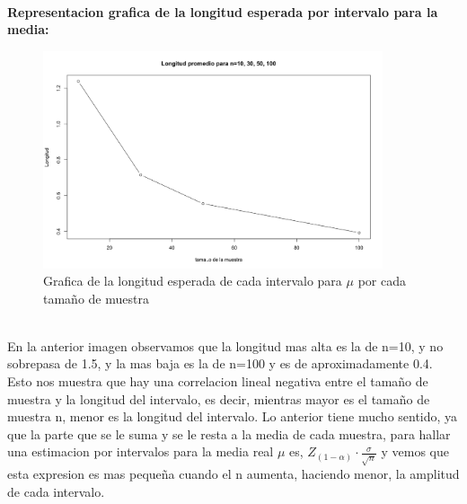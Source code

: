 \documentclass[letterpaper,12pt,onecolumn,titlepage]{article}
\begin{document}
~\\ \textbf{Representacion grafica de la longitud esperada por intervalo para la media:}
~\\ \begin{figure}[!h]
    \begin{center}
        \includegraphics[width=10cm]{Figuras/Pa2.png}
        \caption{Grafica de la longitud esperada de cada intervalo para $\mu$ por cada tama\~{n}o de muestra}
        \label{fig:Densidad}
    \end{center}
\end{figure}
~\\ En la anterior imagen observamos que la longitud mas alta es la de n=10, y no sobrepasa de 1.5, y la mas baja es la de n=100 y es de aproximadamente 0.4. Esto nos muestra que hay una correlacion lineal negativa entre el tama\~{n}o de muestra y la longitud del intervalo, es decir, mientras mayor es el tama\~{n}o de muestra n, menor es la longitud del intervalo. Lo anterior tiene mucho sentido, ya que la parte que se le suma y se le resta a la media de cada muestra, para hallar una estimacion por intervalos para la media real $\mu$ es, $Z_{(1-\alpha)}\cdot\frac{\sigma}{\sqrt{n}}$ y vemos que esta expresion es mas peque\~{n}a cuando el n aumenta, haciendo menor, la amplitud de cada intervalo.
\end{document}
